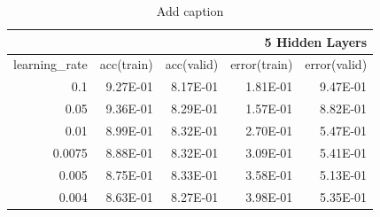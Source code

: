 \documentclass{article}
\begin{document}
\begin{table}[htbp]
  \centering
  \caption{Add caption}
    \begin{tabular}{|r|r|r|r|r|}
    \toprule
    \multicolumn{5}{|p{25em}|}{5 Hidden Layers} \\
    \midrule
    \multicolumn{1}{|r|}{\multirow{2}[2]{*}{learning\_rate}} & \multicolumn{1}{r|}{\multirow{2}[2]{*}{acc(train)}} & \multicolumn{1}{r|}{\multirow{2}[2]{*}{acc(valid)}} & \multicolumn{1}{r|}{\multirow{2}[2]{*}{error(train)}} & \multicolumn{1}{r|}{\multirow{2}[2]{*}{error(valid)}} \\
          &       &       &       &  \\
    \midrule
    \multirow{2}[2]{*}{0.1} & \multirow{2}[2]{*}{9.27E-01} & \multirow{2}[2]{*}{8.17E-01} & \multirow{2}[2]{*}{1.81E-01} & \multirow{2}[2]{*}{9.47E-01} \\
          &       &       &       &  \\
    \midrule
    \multirow{2}[2]{*}{0.05} & \multirow{2}[2]{*}{9.36E-01} & \multirow{2}[2]{*}{8.29E-01} & \multirow{2}[2]{*}{1.57E-01} & \multirow{2}[2]{*}{8.82E-01} \\
          &       &       &       &  \\
    \midrule
    \multirow{2}[2]{*}{0.01} & \multirow{2}[2]{*}{8.99E-01} & \multirow{2}[2]{*}{8.32E-01} & \multirow{2}[2]{*}{2.70E-01} & \multirow{2}[2]{*}{5.47E-01} \\
          &       &       &       &  \\
    \midrule
    \multirow{2}[2]{*}{0.0075} & \multirow{2}[2]{*}{8.88E-01} & \multirow{2}[2]{*}{8.32E-01} & \multirow{2}[2]{*}{3.09E-01} & \multirow{2}[2]{*}{5.41E-01} \\
          &       &       &       &  \\
    \midrule
    \multirow{2}[2]{*}{0.005} & \multirow{2}[2]{*}{8.75E-01} & \multirow{2}[2]{*}{8.33E-01} & \multirow{2}[2]{*}{3.58E-01} & \multirow{2}[2]{*}{5.13E-01} \\
          &       &       &       &  \\
    \midrule
    \multirow{2}[2]{*}{0.004} & \multirow{2}[2]{*}{8.63E-01} & \multirow{2}[2]{*}{8.27E-01} & \multirow{2}[2]{*}{3.98E-01} & \multirow{2}[2]{*}{5.35E-01} \\
          &       &       &       &  \\
    \bottomrule
    \end{tabular}%
  \label{tab:addlabel}%
\end{table}%
\end{document}
